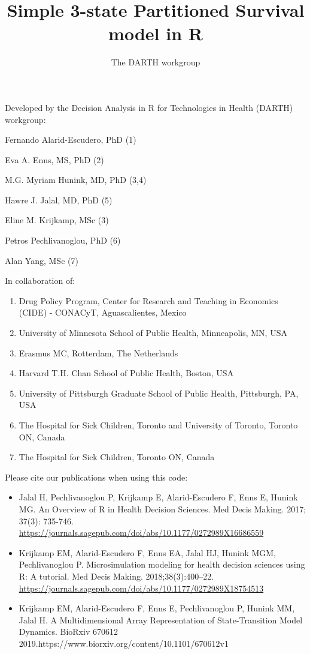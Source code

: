 \documentclass[
]{article}
\title{Simple 3-state Partitioned Survival model in R}
\author{The DARTH workgroup}
\date{}
\providecommand{\tightlist}{%
  \setlength{\itemsep}{0pt}\setlength{\parskip}{0pt}}
\begin{document}
\maketitle

Developed by the Decision Analysis in R for Technologies in Health
(DARTH) workgroup:

Fernando Alarid-Escudero, PhD (1)

Eva A. Enns, MS, PhD (2)

M.G. Myriam Hunink, MD, PhD (3,4)

Hawre J. Jalal, MD, PhD (5)

Eline M. Krijkamp, MSc (3)

Petros Pechlivanoglou, PhD (6)

Alan Yang, MSc (7)

In collaboration of:

\begin{enumerate}
\def\labelenumi{\arabic{enumi}.}
\tightlist
\item
  Drug Policy Program, Center for Research and Teaching in Economics
  (CIDE) - CONACyT, Aguascalientes, Mexico
\item
  University of Minnesota School of Public Health, Minneapolis, MN, USA
\item
  Erasmus MC, Rotterdam, The Netherlands
\item
  Harvard T.H. Chan School of Public Health, Boston, USA
\item
  University of Pittsburgh Graduate School of Public Health, Pittsburgh,
  PA, USA
\item
  The Hospital for Sick Children, Toronto and University of Toronto,
  Toronto ON, Canada
\item
  The Hospital for Sick Children, Toronto ON, Canada
\end{enumerate}

Please cite our publications when using this code:

\begin{itemize}
\item
  Jalal H, Pechlivanoglou P, Krijkamp E, Alarid-Escudero F, Enns E,
  Hunink MG. An Overview of R in Health Decision Sciences. Med Decis
  Making. 2017; 37(3): 735-746.
  \url{https://journals.sagepub.com/doi/abs/10.1177/0272989X16686559}
\item
  Krijkamp EM, Alarid-Escudero F, Enns EA, Jalal HJ, Hunink MGM,
  Pechlivanoglou P. Microsimulation modeling for health decision
  sciences using R: A tutorial. Med Decis Making. 2018;38(3):400--22.
  \url{https://journals.sagepub.com/doi/abs/10.1177/0272989X18754513}
\item
  Krijkamp EM, Alarid-Escudero F, Enns E, Pechlivanoglou P, Hunink MM,
  Jalal H. A Multidimensional Array Representation of State-Transition
  Model Dynamics. BioRxiv 670612
  2019.https://www.biorxiv.org/content/10.1101/670612v1
\end{itemize}
\end{document}
